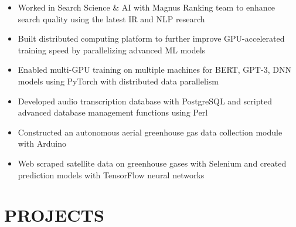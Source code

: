 \documentclass[11pt,letterpaper]{article}
\begin{document}
  \begin{itemize}
    \item{Worked in Search Science \& AI with Magnus Ranking team to enhance search quality using the latest IR and NLP research}
    \item{Built distributed computing platform to further improve GPU-accelerated training speed by parallelizing advanced ML models}
    \item{Enabled multi-GPU training on multiple machines for BERT, GPT-3, DNN models using PyTorch with distributed data parallelism}
  \end{itemize}

  {\fontsize{12}{12}}

  \begin{itemize}
    \item{Developed audio transcription database with PostgreSQL and scripted advanced database management functions using Perl}
  \end{itemize}

  {\fontsize{12}{12}}

  \begin{itemize}
    \item{Constructed an autonomous aerial greenhouse gas data collection module with Arduino}

    \item{Web scraped satellite data on greenhouse gases with Selenium and created prediction models with TensorFlow neural networks}
  \end{itemize}

  \smallskip


  \section*{PROJECTS}

  \ifpolitify
    {\fontsize{12}{12}}
\end{document}
